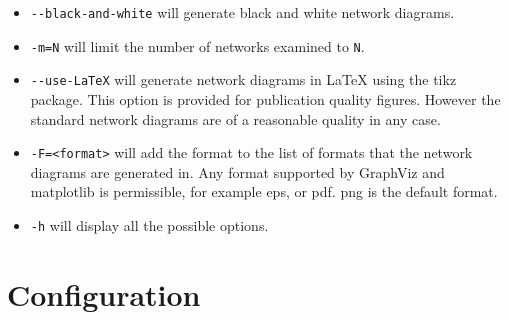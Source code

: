 \documentclass{article}
\begin{document}
\begin{itemize}
\item \verb!--black-and-white! will generate black and white network diagrams.
\item \verb!-m=N! will limit the number of networks examined to \verb!N!.
\item \verb!--use-LaTeX! will generate network diagrams in LaTeX using the tikz package. This option is provided for publication quality figures. However the standard network diagrams are of a reasonable quality in any case.
\item \verb!-F=<format>! will add the format to the list of formats that the network diagrams are generated in. Any format supported by GraphViz and matplotlib is permissible, for example eps, or pdf. png is the default format. 
\item \verb!-h! will display all the possible options.
\end{itemize}



\section{Configuration}
\end{document}
